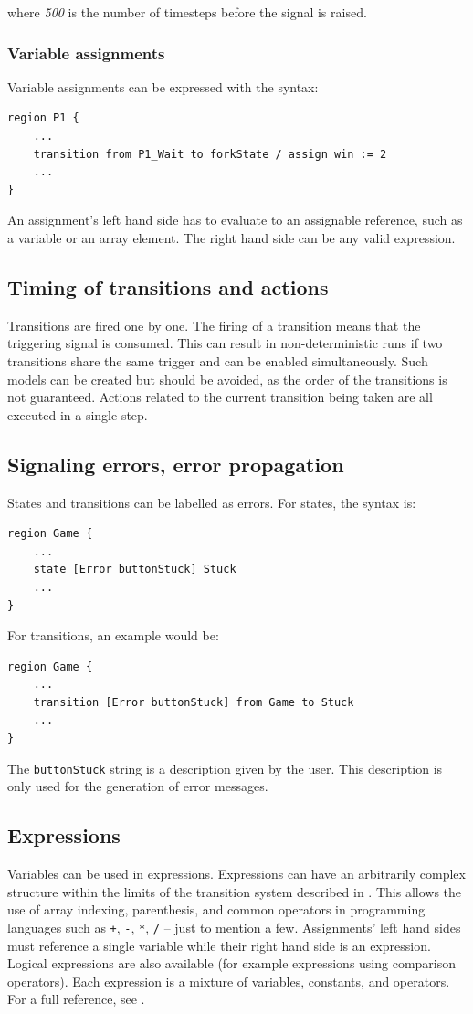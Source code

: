 where \textit{500} is the number of timesteps before the signal is raised.
  \subsubsection{Variable assignments}
Variable assignments can be expressed with the syntax:

\begin{lstlisting}
region P1 {
	...
	transition from P1_Wait to forkState / assign win := 2
	...
}
\end{lstlisting}

An assignment's left hand side has to evaluate to an assignable reference, such as a variable or an array element. The right hand side can be any valid expression.
  \subsection{Timing of transitions and actions}
Transitions are fired one by one. The firing of a transition means that the triggering signal is consumed. This can result in non-deterministic runs if two transitions share the same trigger and can be enabled simultaneously. Such models can be created but should be avoided, as the order of the transitions is not guaranteed. Actions related to the current transition being taken are all executed in a single step.
  \subsection{Signaling errors, error propagation}
States and transitions can be labelled as errors. For states, the syntax is:

\begin{lstlisting}
region Game {
	...
	state [Error buttonStuck] Stuck
	...
}
\end{lstlisting}

For transitions, an example would be:

\begin{lstlisting}
region Game {
	...
	transition [Error buttonStuck] from Game to Stuck
	...
}
\end{lstlisting}

The \verb!buttonStuck! string is a description given by the user. This description is only used for the generation of error messages.
  \subsection{Expressions}
Variables can be used in expressions. Expressions can have an arbitrarily complex structure within the limits of the transition system described in \cite{fapts}. This allows the use of array indexing, parenthesis, and common operators in programming languages such as \verb!+!, \verb!-!, \verb!*!, \verb!/! --  just to mention a few. Assignments' left hand sides must reference a single variable while their right hand side is an expression. Logical expressions are also available (for example expressions using comparison operators). Each expression is a mixture of variables, constants, and operators. For a full reference, see \cite{fapts}.
